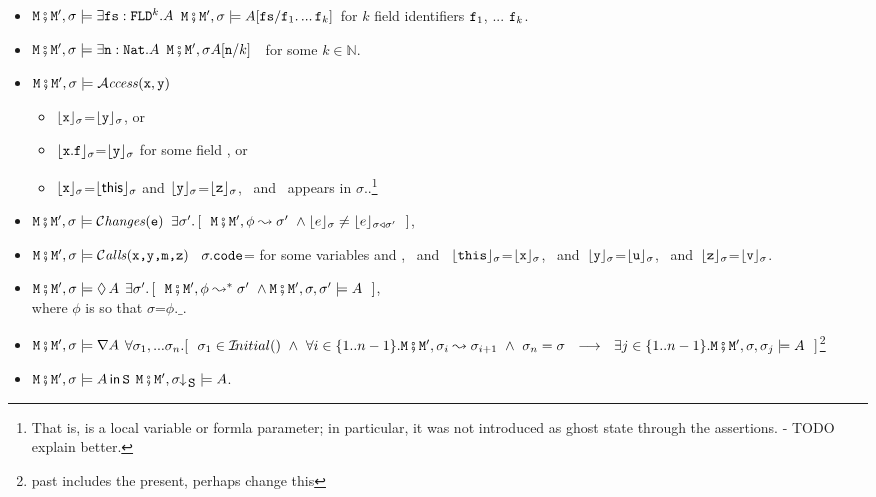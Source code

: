 \begin{definition}
\begin{itemize}
\item
$\M\mkpair \M', \sigma \models  \exists \prg{fs}:\prg{FLD}^k.\A$ \IFF  
$\M\mkpair \M', \sigma \models  \A[\prg{fs}/\prg{f}_1.\,...\,\prg{f}_k]$\  for  $k$ field identifiers $\prg{f}_1$, ... $\prg{f}_k$.
\item
$\M\mkpair \M', \sigma \models  \exists \prg{n}:\prg{Nat}.\A$ \IFF  $\M\mkpair \M', \sigma \A[\prg{n}/k]$\ \ for some $k\in\mathbb{N}$.\item
$\M\mkpair \M', \sigma \models  \CanAccess{\prg{x}}{\prg{y}}$   \IFF  \begin{itemize}
\item
$\interp {\x} {\sigma}$=$\interp {\y} {\sigma}$, or
\item
$\interp {\x.\f} {\sigma}$=$\interp {\y} {\sigma}$  for some field ,  or
\item
$\interp {\x} {\sigma}$=$\interp {\this} {\sigma}$ and
  $\interp {\y} {\sigma}$=$\interp {\z} {\sigma}$,
\
and \z\ appears in  $\sigma$..\footnote{That is, \z is a local variable or formla parameter; in particular, it was   not introduced as ghost state through the assertions. - TODO explain better.}
 \end{itemize}
 \item
 $\M\mkpair \M', \sigma \models   \Changes{\prg{e}}$  \IFF 
 $\exists \sigma'.\, [\ \ \M\mkpair \M',\phi \leadsto \sigma' \ \wedge \interp{e}{\sigma} \neq \interp{e}{\sigma\triangleleft \sigma'} \ \  ]$,\\
 \item
$\M\mkpair \M', \sigma \models  \Calls{\prg{x},\prg{y},\prg{m},\prg{z}}$ \IFF \
 $\sigma.\prg{code}$= for some variables  and ,  \ and \  
$\interp{\prg{this}}{\sigma}$=$\interp{\prg{x}}{\sigma}$, \ and\ $\interp{\prg{y}}{\sigma}$=$\interp{\prg{u}}{\sigma}$,
 \ and\ $\interp{\prg{z}}{\sigma}$=$\interp{\prg{v}}{\sigma}$.
 \item
  $\M\mkpair \M', \sigma \models  \Future \A $
  \IFF
  $\exists \sigma'.\, [\ \ \M\mkpair \M',\phi \leadsto^* \sigma' \ \wedge \M\mkpair \M',\sigma,\sigma' \models \A \ \  ]$,\\
 where $\phi$ is so that $\sigma$=$\phi.\_$.

 \item
 $\M\mkpair \M', \sigma \models  \Past \A $ \IFF 
 $\forall \sigma_1, ... \sigma_n. [\ \ \sigma_1\in \Initial{}\ \wedge \ 
 \forall i\in\{1..n-1\}. \M\mkpair \M', \sigma_{i} \leadsto  \sigma_{i+1} \ \wedge \ 
 \sigma_n=\sigma \ \ \longrightarrow \ \ \exists j\in\{1..n-1\}.
 \M\mkpair \M', \sigma, \sigma_j  \models \A\ \ 
 ]$\footnote{past includes the present, perhaps change this}
 
 \item
 $\M\mkpair \M', \sigma \models \Using \A \prg{S}$
 \IFF
 $\M\mkpair \M', \restrct \sigma {\prg{S}} \models  \A  $.


\end{itemize}

\end{definition} 


